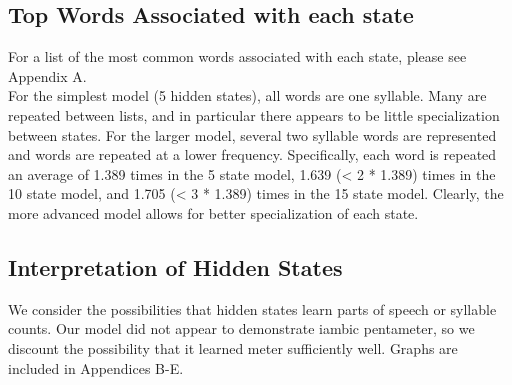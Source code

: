 \medskip

\subsection{Top Words Associated with each state}
For a list of the most common words associated with each state, please see Appendix A.\\

For the simplest model (5 hidden states), all words are one syllable. Many are repeated between lists, and in particular there appears to be little specialization between states. For the larger model, several two syllable words are represented and words are repeated at a lower frequency. Specifically, each word is repeated an average of 1.389 times in the 5 state model, 1.639 (< 2 * 1.389) times in the 10 state model, and 1.705 (< 3 * 1.389) times in the 15 state model. Clearly, the more advanced model allows for better specialization of each state.

\subsection{Interpretation of Hidden States}
We consider the possibilities that hidden states learn parts of speech or syllable counts. Our model did not appear to demonstrate iambic pentameter, so we discount the possibility that it learned meter sufficiently well. Graphs are included in Appendices B-E.\\

